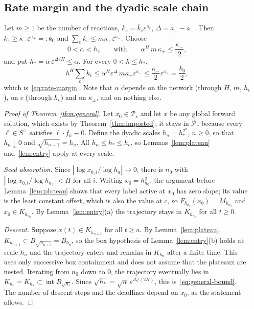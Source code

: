 \documentclass[11pt,a4paper]{article}
\theoremstyle{plain}
\theoremstyle{definition}
\theoremstyle{remark}
\newcommand{\eps}{\varepsilon}
\newcommand{\calP}{\mathcal P}
\begin{document}
\subsection{Rate margin and the dyadic scale chain}
Let $m\ge1$ be the number of reactions, $k_e=\bar k_e\eps^{a_e}$, $\Delta=a_+-a_-$. Then $k_e\ge\kappa_-\eps^{a_+}=:k_0$ and $\sum_ek_e\le m\kappa_+\eps^{a_-}$. Choose
\begin{equation}\label{eq:alpha}
 0<\alpha<h_c\qquad\text{with}\qquad \alpha^{H}\,m\,\kappa_+\le\frac{\kappa_-}{2},
\end{equation}
and put $h_*=\alpha\,\eps^{\Delta/H}\le\alpha$. For every $0<h\le h_*$,
\[
 h^H\sum_ek_e\le\alpha^H\eps^{\Delta}\,m\kappa_+\eps^{a_-}\le\frac{\kappa_-}{2}\eps^{a_+}=\frac{k_0}2 ,
\]
which is~\eqref{eq:rate-margin}. Note that $\alpha$ depends on the network (through $H$, $m$, $h_c$), on $c$ (through $h_c$) and on $\kappa_\pm$, and on nothing else.

\begin{proof}[Proof of Theorem~\ref{thm:general}]
Let $x_0\in\calP_c$ and let $x$ be any global forward solution, which exists by Theorem~\ref{thm:imported}; it stays in $\calP_c$ because every $\ell\in S^\perp$ satisfies $\ell\cdot f_k\equiv0$. Define the dyadic scales $h_n=h_*^{2^n}$, $n\ge0$, so that $h_n\downarrow0$ and $\sqrt{h_{n+1}}=h_n$. All $h_n\le h_*\le h_c$, so Lemmas~\ref{lem:plateau} and~\ref{lem:entry} apply at every scale.

\emph{Seed absorption.} Since $|\log x_{0,i}/\log h_n|\to0$, there is $n_0$ with $|\log x_{0,i}/\log h_{n_0}|<H$ for all $i$. Writing $x_0=h_{n_0}^{q}$, the argument before Lemma~\ref{lem:plateau} shows that every label active at $x_0$ has zero slope; its value is the least constant offset, which is also the value at $c$, so $F_{h_{n_0}}(x_0)=M_{h_{n_0}}$ and $x_0\in K_{h_{n_0}}$. By Lemma~\ref{lem:entry}(a) the trajectory stays in $K_{h_{n_0}}$ for all $t\ge0$.

\emph{Descent.} Suppose $x(t)\in K_{h_{n+1}}$ for all $t\ge a$. By Lemma~\ref{lem:plateau}, $K_{h_{n+1}}\subset B_{\sqrt{h_{n+1}}}=B_{h_n}$, so the box hypothesis of Lemma~\ref{lem:entry}(b) holds at scale $h_n$ and the trajectory enters and remains in $K_{h_n}$ after a finite time. This uses only successive box containment and does not assume that the plateaux are nested. Iterating from $n_0$ down to $0$, the trajectory eventually lies in $K_{h_0}=K_{h_*}\subset\operatorname{int}B_{\sqrt{h_*}}$. Since $\sqrt{h_*}=\sqrt\alpha\,\eps^{\Delta/(2H)}$, this is~\eqref{eq:general-bound}. The number of descent steps and the deadlines depend on $x_0$, as the statement allows.
\end{proof}
\end{document}
